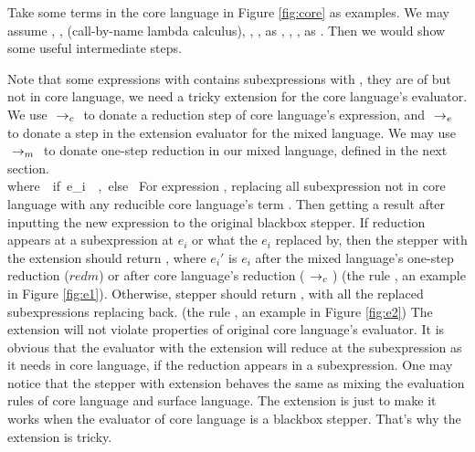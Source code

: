 Take some terms in the core language in Figure \ref{fig:core} as examples.
We may assume , ,  (call-by-name lambda calculus), , ,  as , , \m{$\lambda$},  as . Then we would show some useful intermediate steps.

Note that some expressions with  contains subexpressions with , they are of  but not in core language, we need a tricky extension for the core language's evaluator.
We use $~\rightarrow_c~$ to donate a reduction step of core language's expression, and $~\rightarrow_e~$ to donate a step in the extension evaluator for the mixed language. We may use $~\rightarrow_m~$ to donate one-step reduction in our mixed language, defined in the next section.
{}
{\\where~~if~e_i~\in~,~else~}
{}
For expression , replacing all subexpression not in core language with any reducible core language's term . Then getting a result after inputting the new expression  to the original blackbox stepper. If reduction appears at a subexpression at $e_i$ or what the $e_i$ replaced by, then the stepper with the extension should return , where $e_i'$ is $e_i$ after the mixed language's one-step reduction ($redm{}{}$) or after core language's reduction ($~\rightarrow_c~$) (the rule , an example in Figure \ref{fig:e1}). Otherwise, stepper should return , with all the replaced subexpressions replacing back. (the rule , an example in Figure \ref{fig:e2}) The extension will not violate properties of original core language's evaluator. It is obvious that the evaluator with the extension will reduce at the subexpression as it needs in core language, if the reduction appears in a subexpression. One may notice that the stepper with extension behaves the same as mixing the evaluation rules of core language and surface language. The extension is just to make it works when the evaluator of core language is a blackbox stepper. That's why the extension is tricky.

